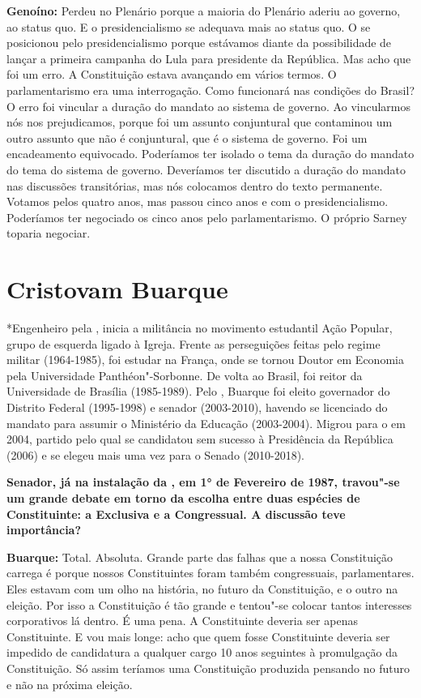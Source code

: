\textbf{Genoíno:} Perdeu no Plenário porque a maioria do Plenário aderiu
ao governo, ao status quo. E o presidencialismo se adequava mais ao
status quo. O  se posicionou pelo presidencialismo porque estávamos
diante da possibilidade de lançar a primeira campanha do Lula para
presidente da República. Mas acho que foi um erro. A Constituição estava
avançando em vários termos. O parlamentarismo era uma interrogação. Como
funcionará nas condições do Brasil? O erro foi vincular a duração do
mandato ao sistema de governo. Ao vincularmos nós nos prejudicamos,
porque foi um assunto conjuntural que contaminou um outro assunto que
não é conjuntural, que é o sistema de governo. Foi um encadeamento
equivocado. Poderíamos ter isolado o tema da duração do mandato do tema
do sistema de governo. Deveríamos ter discutido a duração do mandato nas
discussões transitórias, mas nós colocamos dentro do texto permanente.
Votamos pelos quatro anos, mas passou cinco anos e com o
presidencialismo. Poderíamos ter negociado os cinco anos pelo
parlamentarismo. O próprio Sarney toparia negociar.

\chapter{Cristovam Buarque}

*Engenheiro pela , inicia a militância no movimento estudantil Ação
Popular, grupo de esquerda ligado à Igreja. Frente as perseguições
feitas pelo regime militar (1964-1985), foi estudar na França, onde se
tornou Doutor em Economia pela Universidade Panthéon"-Sorbonne. De volta
ao Brasil, foi reitor da Universidade de Brasília (1985-1989). Pelo ,
Buarque foi eleito governador do Distrito Federal (1995-1998) e senador
(2003-2010), havendo se licenciado do mandato para assumir o Ministério
da Educação (2003-2004). Migrou para o  em 2004, partido pelo qual se
candidatou sem sucesso à Presidência da República (2006) e se elegeu
mais uma vez para o Senado (2010-2018).

\textbf{Senador, já na instalação da , em 1° de Fevereiro de 1987,
travou"-se um grande debate em torno da escolha entre duas espécies de
Constituinte: a Exclusiva e a Congressual. A discussão teve
importância?}

\textbf{Buarque:} Total. Absoluta. Grande parte das falhas que a nossa
Constituição carrega é porque nossos Constituintes foram também
congressuais, parlamentares. Eles estavam com um olho na história, no
futuro da Constituição, e o outro na eleição. Por isso a Constituição é
tão grande e tentou"-se colocar tantos interesses corporativos lá dentro.
É uma pena. A Constituinte deveria ser apenas Constituinte. E vou mais
longe: acho que quem fosse Constituinte deveria ser impedido de
candidatura a qualquer cargo 10 anos seguintes à promulgação da
Constituição. Só assim teríamos uma Constituição produzida pensando no
futuro e não na próxima eleição.

